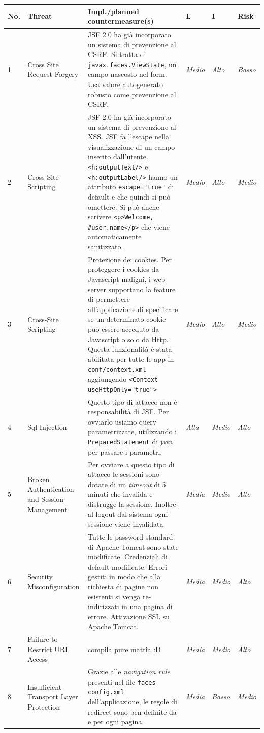 \documentclass{article}
\begin{document}
\begin{footnotesize}
\begin{longtable}{p{0.3cm}p{3cm}p{4.6cm}p{0.5cm}p{0.5cm}p{0.5cm}}
No. & Threat & Impl./planned countermeasure(s) & L & I & Risk \\
\hline
 1 & Cross Site Request Forgery & JSF 2.0 ha già incorporato un sistema di prevenzione al CSRF. Si tratta di {\tt javax.faces.ViewState}, un campo nascosto nel form. Usa valore autogenerato robusto come prevenzione al CSRF. & {\it Medio} & {\it Alto} & {\it Basso} \\
\hline
 2 & Cross-Site Scripting & JSF 2.0 ha già incorporato un sistema di prevenzione al XSS. JSF fa l'escape nella visualizzazione di un campo inserito dall'utente. {\tt <h:outputText/>} e {\tt <h:outputLabel/>} hanno un attributo {\tt escape="true"} di default e che quindi si può omettere. Si può anche scrivere {\tt<p>Welcome, \#{user.name}</p>} che viene automaticamente sanitizzato. & {\it Medio} & {\it Alto} & {\it Medio} \\
\hline
3 & Cross-Site Scripting & Protezione dei cookies. Per proteggere i cookies da Javascript maligni, i web server supportano la feature di permettere all'applicazione di specificare se un determinato cookie può essere acceduto da Javascript o solo da Http. Questa funzionalità è stata abilitata per tutte le app in {\tt conf/context.xml} aggiungendo {\tt <Context useHttpOnly="true">} & {\it Medio} & {\it Alto} & {\it Medio} \\
\hline
 4 & Sql Injection & Questo tipo di attacco non è responsabilità di JSF. Per ovviarlo usiamo query parametrizzate, utilizzando i {\tt PreparedStatement} di java per passare i parametri. & {\it Alta} & {\it Medio} & {\it Alto}\\
\hline
 5 & Broken Authentication and Session Management  & Per ovviare a questo tipo di attacco le sessioni sono dotate di un \emph{timeout} di 5 minuti che invalida e distrugge la sessione. Inoltre al logout dal sistema ogni sessione viene invalidata.
 & {\it Media} & {\it Medio} & {\it Alto}\\
\hline
 6 & Security Misconfiguration & Tutte le password standard di Apache Tomcat sono state modificate. Credenziali di default modificate. Errori gestiti in modo che alla richiesta di pagine non esistenti si venga re-indirizzati in una pagina di errore. Attivazione SSL su Apache Tomcat. & {\it Media} & {\it Medio} & {\it Alto}\\
\hline
 7 & Failure to Restrict URL Access & compila pure mattia :D & {\it Media} & {\it Medio} & {\it Alto}\\
\hline
 8 & Insufficient Transport Layer Protection & Grazie alle \emph{navigation rule} presenti nel file {\tt faces-config.xml} dell'applicazione, le regole di redirect sono ben definite da e per ogni pagina.  & {\it Media} & {\it Basso} & {\it Medio} \\
\hline
\end{longtable}
\end{footnotesize}
\end{document}
